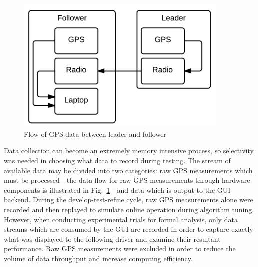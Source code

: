 \begin{figure}[ht] \centering
    \includegraphics[width=4in]{./figs/hardware_flow.png}
    \caption{Flow of GPS data between leader and follower} \label{fig:hardwareflow}
\end{figure}

Data collection can become an extremely memory intensive process, so selectivity was needed in choosing what data to record during testing. The stream of available data may be divided into two categories: raw GPS measurements which must be processed---the data flow for raw GPS measurements through hardware components is illustrated in Fig.~\ref{fig:hardwareflow}---and  data which is output to the GUI backend. During the develop-test-refine cycle, raw GPS measurements alone were recorded and then replayed to simulate online operation during algorithm tuning. However, when conducting experimental trials for formal analysis, only data streams which are consumed by the GUI are recorded in order to capture exactly what was displayed to the following driver and examine their resultant performance. Raw GPS measurements were excluded in order to reduce the volume of data throughput and increase computing efficiency.


